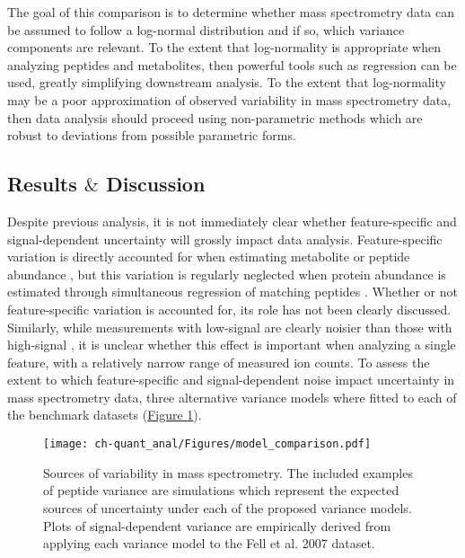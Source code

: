 The goal of this comparison is to determine whether mass spectrometry data can be assumed to follow a log-normal distribution and if so, which variance components are relevant. To the extent that log-normality is appropriate when analyzing peptides and metabolites, then powerful tools such as regression can be used, greatly simplifying downstream analysis. To the extent that log-normality may be a poor approximation of observed variability in mass spectrometry data, then data analysis should proceed using non-parametric methods which are robust to deviations from possible parametric forms.

\subsection{Results $\&$ Discussion}

Despite previous analysis, it is not immediately clear whether feature-specific and signal-dependent uncertainty will grossly impact data analysis. Feature-specific variation is directly accounted for when estimating metabolite or peptide abundance \cite{Costenoble:2011hia, Boer:2010fb}, but this variation is regularly neglected when protein abundance is estimated through simultaneous regression of matching peptides \cite{Oberg:2012bm}. Whether or not feature-specific variation is accounted for, its role has not been clearly discussed.  Similarly, while measurements with low-signal are clearly noisier than those with high-signal \cite{Zhu:2011jr,Oberg:2012bm,Navarro:2014ke}, it is unclear whether this effect is important when analyzing a single feature, with a relatively narrow range of measured ion counts. To assess the extent to which feature-specific and signal-dependent noise impact uncertainty in mass spectrometry data, three alternative variance models where fitted to each of the benchmark datasets (\hyperref[ch-quant_anal:modelComparison]{Figure \ref{ch-quant_anal:modelComparison}}). 

\begin{figure}[h!]
\begin{center}
\texttt{[image: ch-quant\_anal/Figures/model\_comparison.pdf]}
\caption[Sources of variability in mass spectrometry]{Sources of variability in mass spectrometry. The included examples of peptide variance are simulations which represent the expected sources of uncertainty under each of the proposed variance models. Plots of signal-dependent variance are empirically derived from applying each variance model to the Fell et al. 2007 dataset.}
\label{ch-quant_anal:modelComparison}
\end{center}
\end{figure}

